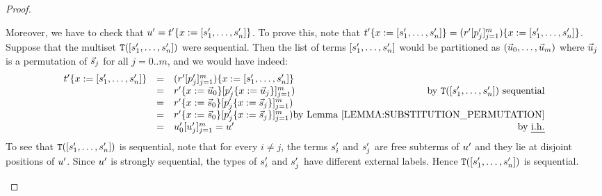 \begin{proof}
\begin{enumerate}
  Moreover, we have to check that $u' = t'\{x := [s'_1,\hdots,s'_n]\}$.
  To prove this,
  note that $t'\{x := [s'_1,\hdots,s'_n]\} = (r'[p'_j]_{j=1}^{m})\{x := [s'_1,\hdots,s'_n]\}$.
  Suppose that the multiset $\mathtt{T}([s'_1,\hdots,s'_n])$ were sequential.
  Then the list of terms $[s'_1,\hdots,s'_n]$ would be partitioned
  as $(\vec{u}_0,\hdots,\vec{u}_m)$
  where $\vec{u}_j$ is a permutation of $\vec{s}_j$ for all $j=0..m$,
  and we would have indeed:
  \[
    \begin{array}{rcll}
      \subs{\tm'}{\var}{[\tmtwo'_1,\hdots,\tmtwo'_n]}
    & = &
      \subs{(\tmfour'[\tmfive'_j]_{j=1}^{m})}{\var}{[\tmtwo'_1,\hdots,\tmtwo'_n]} \\
    & = & 
      \subs{\tmfour'}{\var}{\ls{\tmthree}_0}[\subs{\tmfive'_j}{\var}{\ls{\tmthree}_j}]_{j=1}^{m})
      \hfill\text{ by $\tmlabel{[\tmtwo'_1,\hdots,\tmtwo'_n]}$ sequential} \\
    & = & 
      \subs{\tmfour'}{\var}{\ls{\tmtwo}_0}[\subs{\tmfive'_j}{\var}{\ls{\tmtwo}_j}]_{j=1}^{m})
   \\
    & = & 
      \subs{\tmfour'}{\var}{\ls{\tmtwo}_0}[\subs{\tmfive'_j}{\var}{\ls{\tmtwo}_j}]_{j=1}^{m}) \hfill\text{by \rlem{substitution_permutation}} \\
    & = & 
      \tmthree'_0[\tmthree'_j]_{j=1}^{m} = \tmthree' \hfill\text{by \ih}
    \end{array}
  \]
  To see that $\mathtt{T}([s'_1,\hdots,s'_n])$ is sequential,
  note that for every $i \neq j$,
  the terms $s'_i$ and $s'_j$ are free subterms of $u'$
  and they lie at disjoint positions of $u'$.
  Since $u'$ is strongly sequential, the types of $s'_i$ and $s'_j$
  have different external labels. Hence $\mathtt{T}([s'_1,\hdots,s'_n])$ is sequential.


\end{enumerate}
\end{proof}

